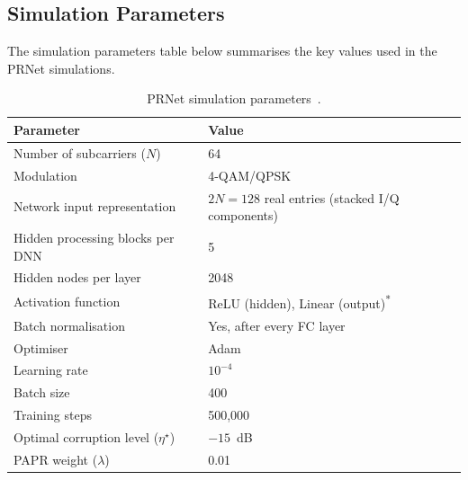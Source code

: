 \subsection{Simulation Parameters}

The simulation parameters table below summarises the key values used in the
PRNet simulations.

\begin{table}[H]
    \centering
    \caption{PRNet simulation parameters~\cite{kim2017novel}.}
    \label{tab:prnet_params}
    \begin{tabularx}{\linewidth}{@{} l X @{}}
        \toprule
        \textbf{Parameter}                      & \textbf{Value}                                 \\
        \midrule
        Number of subcarriers ($N$)             & 64                                             \\
        Modulation                              & 4-QAM/QPSK                                     \\
        Network input representation            & $2N=128$ real entries (stacked I/Q components) \\
        Hidden processing blocks per DNN        & 5                                              \\
        Hidden nodes per layer                  & 2048                                           \\
        Activation function                     & ReLU (hidden), Linear (output)\textsuperscript{*} \\
        Batch normalisation                     & Yes, after every FC layer                      \\
        Optimiser                               & Adam                                           \\
        Learning rate                           & $10^{-4}$                                      \\
        Batch size                              & 400                                            \\
        Training steps                          & 500{,}000                                      \\
        Optimal corruption level ($\eta^\star$) & $-15$~dB                                       \\
        PAPR weight ($\lambda$)                 & 0.01                                           \\

\end{tabularx}
\end{table}
